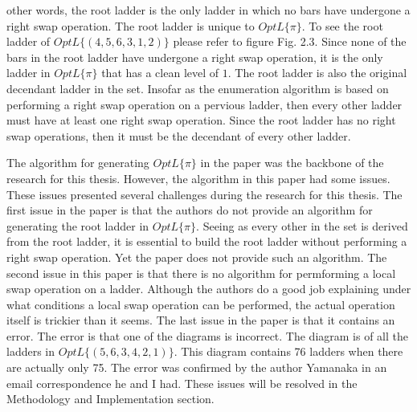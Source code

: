 other words, the root ladder is the only ladder in which no bars have undergone 
a right swap operation. The root ladder is unique to $OptL\{\pi\}$. To see the root ladder 
of $OptL\{(4,5,6,3,1,2)\}$ please refer to figure Fig. 2.3. Since none of
the bars in the root ladder have undergone a right swap operation, it is the only 
ladder in $OptL\{\pi\}$ that has a clean level of $1$. The root ladder is
also the original decendant ladder in the set. Insofar as the enumeration algorithm 
is based on performing a right swap operation on a pervious ladder, then every other 
ladder must have at least one right swap operation. Since the root ladder has
no right swap operations, then it must be the decendant of every other ladder.\par 
The algorithm for generating $OptL\{\pi\}$ in the paper was the backbone 
of the research for this thesis. However, the algorithm in this paper had some 
issues. These issues presented several challenges during the research for this thesis.
The first issue in the paper is that the authors do not provide an algorithm for
generating the root ladder in $OptL\{\pi\}$. Seeing as every other in the set 
is derived from the root ladder, it is essential to build the root ladder without
performing a right swap operation. Yet the paper does not provide such an 
algorithm. The second issue in this paper is that there is no algorithm 
for permforming a local swap operation on a ladder. Although the authors 
do a good job explaining under what conditions a local swap operation can 
be performed, the actual operation itself is trickier than it seems. The last 
issue in the paper is that it contains an error. The error is that one of the diagrams is incorrect. 
The diagram is of all the ladders in $OptL\{(5,6,3,4,2,1)\}$. This diagram contains 76 
ladders when there are actually only 75. The error was confirmed by the author Yamanaka in an 
email correspondence he and I had. These issues will be resolved in the Methodology and Implementation
section.

